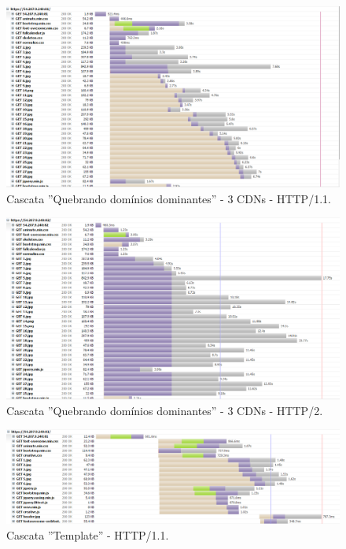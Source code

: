 \begin{apendicesenv}
\begin{landscape}
	\begin{figure}[!htb]
    	\centering
	    \caption{Cascata ''Quebrando domínios dominantes'' - 3 CDNs - HTTP/1.1.}
	    \includegraphics[width=1.5\textwidth]{./04-figuras/cascatas/3cds_http11}
	\end{figure}
\end{landscape}

\begin{landscape}
	\begin{figure}[!htb]
    	\centering
	    \caption{Cascata ''Quebrando domínios dominantes'' - 3 CDNs - HTTP/2.}
    	\includegraphics[width=1.5\textwidth]{./04-figuras/cascatas/3cds_http2}
	\end{figure}
\end{landscape}

\begin{landscape}
	\begin{figure}[!htb]
    	\centering
	    \caption{Cascata ''Template'' - HTTP/1.1.}
	    \includegraphics[width=1.5\textwidth]{./04-figuras/cascatas/template_http11}
	\end{figure}
\end{landscape}


\end{apendicesenv}
